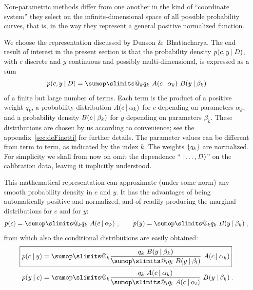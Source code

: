 \documentclass[\ifafour a4paper,12pt,\else a5paper,10pt,\fi%
onecolumn,oneside,article,%
british%
]{memoir}
\makeatletter
\theoremstyle{remark}
\theoremstyle{innote}
\def\sum{\DOTSI\sumop\slimits@}
\newcommand*{\amp}{\&}
\DeclarePairedDelimiter\set{\{}{\}} %
\renewcommand*{\|}[1][]{\nonscript\:#1\vert\nonscript\:\mathopen{}}
\makeatother
\begin{document}
Non-parametric methods differ from one another in the kind of \enquote{coordinate system} they select on the infinite-dimensional space of all possible probability curves, that is, in the way they represent a general positive normalized function.

We choose the representation discussed by Dunson \amp\ Bhattacharya\autocites{dunsonetal2011}[see also the special case discussed by][]{rasmussen1999}. The end result of interest in the present section is that the probability density $p(c,y \| D)$, with $c$ discrete and $y$ continuous and possibly multi-dimensional, is expressed as a sum
\begin{equation}
  \label{eq:representation_P}
  p(c, y \| D) = \sum_{k} q_{k}\ A(c \| \alpha_{k})\ B(y \| \beta_{k})
\end{equation}
of a finite but large number of terms. Each term is the product of a positive weight $q_{k}$, a probability distribution $A(c \| \alpha_{k})$ for $c$ depending on parameters $\alpha_{k}$, and a probability density $B(c \| \beta_{k})$ for $y$ depending on parameters $\beta_{k}$. These distributions are chosen by us according to convenience; see the appendix~\ref{sec:deFinetti} for further details. The parameter values can be different from term to term, as indicated by the index $k$. The weights $\set{q_{k}}$ are normalized. For simplicity we shall from now on omit the dependence \enquote{$\|\dotsc, D)$} on the calibration data, leaving it implicitly understood.

This mathematical representation can approximate (under some norm) any smooth probability density in $c$ and $y$. It has the advantages of being automatically positive and normalized, and of readily producing the marginal distributions for $c$ and for $y$:
\begin{equation}
  \label{eq:marginals}
  p(c) = \sum_{k} q_{k}\ A(c \| \alpha_{k})\ ,
  \qquad
  p(y) = \sum_{k} q_{k}\ B(y \| \beta_{k}) \ ,
\end{equation}
from which also the conditional distributions are easily obtained:
\begin{subequations} \label{eq:conditionals}
  \begin{align}
    \label{eq:conditional_c_given_y}
  \Aboxed{  p(c \| y) &= \sum_{k} \frac{q_{k}\ B(y \| \beta_{k})
                }{\sum_{l} q_{l}\ B(y \| \beta_{l})}\
                A(c \| \alpha_{k})}
    \\
    \label{eq:conditional_y_given_c}
    p(y \| c) &= \sum_{k} \frac{q_{k}\ A(c \| \alpha_{k})
                }{\sum_{l} q_{l}\ A(c \| \alpha_{l})}\
                B(y \| \beta_{k}) \ .
  \end{align}
\end{subequations}
\end{document}
